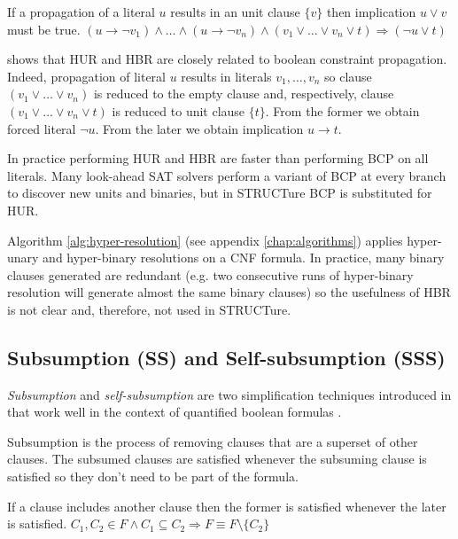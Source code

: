 \begin{myprop}
  If a propagation of a literal $u$ results in an unit clause $\{ v \}$
  then implication $u \lor v$ must be true.
  $(u \rightarrow \neg v_1) \land \ldots
  \land (u \rightarrow \neg v_n)
  \land (v_1 \lor \dots \lor v_n \lor t) \Rightarrow (\neg u \lor t)$
\end{myprop}

\cite{Bacchus03effectivepreprocessing} shows that HUR and HBR
are closely related to boolean constraint propagation.  Indeed,
propagation of literal $u$ results in literals $v_1, \ldots, v_n$
so clause $(v_1 \lor \dots \lor v_n)$ is reduced to the empty
clause and, respectively, clause $(v_1 \lor \dots \lor v_n \lor
t)$ is reduced to unit clause $\{ t \}$. From the former we obtain
forced literal $\neg u$. From the later we obtain implication $u
\rightarrow t$.

In practice performing HUR and HBR are faster than performing BCP on
all literals. Many look-ahead SAT solvers perform a variant of BCP
\cite{Freeman:1995:IPS:220639} at every branch to discover new units
and binaries, but in STRUCTure BCP is substituted for HUR.

Algorithm \ref{alg:hyper-resolution} (see appendix
\ref{chap:algorithms}) applies hyper-unary and hyper-binary
resolutions on a CNF formula. In practice, many binary clauses
generated are redundant (e.g. two consecutive runs of hyper-binary
resolution will generate almost the same binary clauses) so the
usefulness of HBR is not clear and, therefore, not used in STRUCTure.


\subsection{Subsumption (SS) and Self-subsumption (SSS)}
\label{ssec:sss}

\emph{Subsumption} and \emph{self-subsumption} are two simplification
techniques introduced in \cite{Een05effectivepreprocessing}
that work well in the context of quantified boolean formulas
\cite{Biere04resolveand}.

Subsumption is the process of removing clauses that are a superset
of other clauses. The subsumed clauses are satisfied whenever
the subsuming clause is satisfied so they don't need to be part of
the formula.

\begin{myprop}[Subsumption]
  If a clause includes another clause then the former is satisfied whenever the
  later is satisfied.
  $C_1, C_2 \in F \land C_1 \subseteq C_2 \Rightarrow F \equiv F \setminus \{
  C_2 \}$
\end{myprop}

